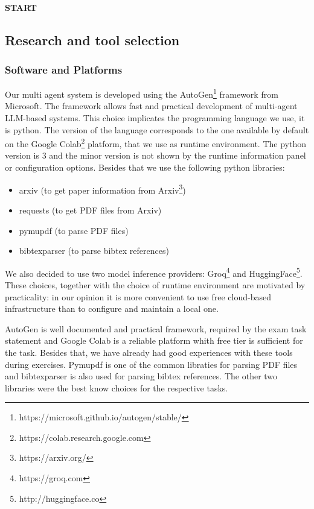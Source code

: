 
\paragraph{START}

\subsection{Research and tool selection}

\subsubsection{Software and Platforms}
\label{choice:software}

Our multi agent system is developed using the AutoGen\footnote{https://microsoft.github.io/autogen/stable/} framework from Microsoft. The framework allows fast and practical development of multi-agent LLM-based systems. This choice implicates the programming language we use, it is python. The version of the language corresponds to the one available by default on the Google Colab\footnote{https://colab.research.google.com} platform, that we use as runtime environment. The python version is 3 and the minor version is not shown by the runtime information panel or configuration options. Besides that we use the following python libraries:

\begin{itemize}
	\item arxiv (to get paper information from Arxiv\footnote{https://arxiv.org/})
	\item requests (to get PDF files from Arxiv)
	\item pymupdf (to parse PDF files)
	\item bibtexparser (to parse bibtex references)
\end{itemize}

We also decided to use two model inference providers: Groq\footnote{https://groq.com} and HuggingFace\footnote{http://huggingface.co}. These choices, together with the choice of runtime environment are motivated by practicality: in our opinion it is more convenient to use free cloud-based infrastructure than to configure and maintain a local one.

AutoGen is well documented and practical framework, required by the exam task statement and Google Colab is a reliable platform whith free tier is sufficient for the task. Besides that, we have already had good experiences with these tools during exercises. Pymupdf is one of the common libraties for parsing PDF files and bibtexparser is also used for parsing bibtex references. The other two libraries were the best know choices for the respective tasks.



